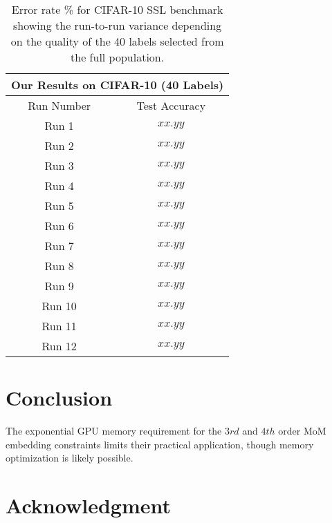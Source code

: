 \documentclass[10pt,twocolumn,letterpaper]{article}
\begin{document}
\begin{table}[htbp]
	\begin{tabular}{c|c}
		\multicolumn{2}{c}{Our Results on CIFAR-10 (40 Labels)}\\
		\hline
		Run Number            & Test Accuracy \\ 
		
		\hline
		Run 1   & $xx.yy$     \\ 
		Run 2      & $xx.yy$    \\
		Run 3   & $xx.yy$ \\
		Run 4    & $xx.yy$ \\
		Run 5    & $xx.yy$ \\ 
		Run 6    & $xx.yy$ \\ 
		Run 7    & $xx.yy$ \\ 
		Run 8    & $xx.yy$ \\ 
		Run 9    & $xx.yy$  \\ 
		Run 10    & $xx.yy$ \\ 
		Run 11   & $xx.yy$ \\ 
		Run 12    & $xx.yy$ \\ 
		
	\end{tabular}
	\caption{Error rate \% for CIFAR-10 SSL benchmark showing the run-to-run variance depending on the quality of the 40 labels selected from the full population.}
	\label{table4}
\end{table}




\section{Conclusion}

The exponential GPU memory requirement for the $3rd$ and $4th$ order MoM embedding constraints limits their practical application, though memory optimization is likely possible.



\section{Acknowledgment}


{
	\small
	
	
}
\end{document}
